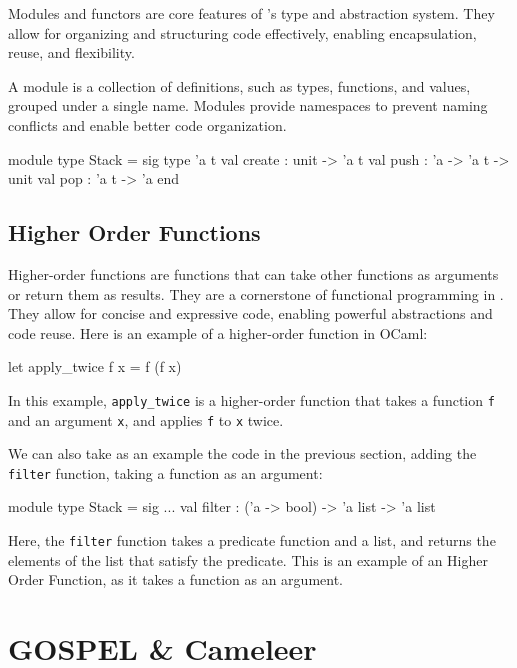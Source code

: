 Modules and functors are core features of \ocaml’s type and abstraction system. 
They allow for organizing and structuring code effectively, enabling encapsulation, 
reuse, and flexibility.

A module is a collection of definitions, such as types, functions, and values, 
grouped under a single name. Modules provide namespaces to prevent naming conflicts 
and enable better code organization.

\begin{ocamlenv}
    module type Stack = sig
        type 'a t
        val create : unit -> 'a t
        val push : 'a -> 'a t -> unit
        val pop : 'a t -> 'a
    end
\end{ocamlenv}

\subsection{Higher Order Functions}
\label{sub:higher_order_functions}

Higher-order functions are functions that can take other functions as arguments 
or return them as results. They are a cornerstone of functional programming in \ocaml.
They allow 
for concise and expressive code, enabling powerful abstractions and code reuse. 
Here is an example of a higher-order function in OCaml:

\begin{ocamlenv}
    let apply_twice f x = f (f x)
\end{ocamlenv}

In this example, \texttt{apply\_twice} is a higher-order function that takes a function 
\texttt{f} and an argument \texttt{x}, and applies \texttt{f} to \texttt{x} twice.

We can also take as an example the code in the previous section, adding the \texttt{filter} 
function, taking a function as an argument:

\begin{ocamlenv}
    module type Stack = sig
        ...
        val filter : ('a -> bool) -> 'a list -> 'a list
\end{ocamlenv}

Here, the \texttt{filter} function takes a predicate function and a list, and returns 
the elements of the list that satisfy the predicate. This is an example of an Higher Order 
Function, as it takes a function as an argument.

\section{GOSPEL \& Cameleer}
\label{sec:gospel_and_cameleer}


